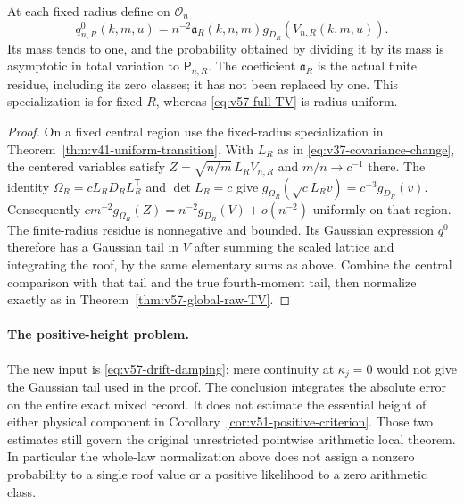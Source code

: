 \begin{corollary}
\label{cor:v57-fixed-radius-raw}
At each fixed radius define on $\mathcal O_n$
\[
 q^0_{n,R}(k,m,u)=n^{-2}\mathfrak a_R(k,n,m)
                                      g_{D_R}(V_{n,R}(k,m,u)).
\]
Its mass tends to one, and the probability obtained by dividing it
by its mass is asymptotic in total variation to $\mathsf P_{n,R}$.
The coefficient $\mathfrak a_R$ is the actual finite residue, including
its zero classes; it has not been replaced by one. This specialization
is for fixed $R$, whereas \eqref{eq:v57-full-TV} is radius-uniform.
\end{corollary}
\begin{proof}
On a fixed central region use the fixed-radius specialization in
Theorem~\ref{thm:v41-uniform-transition}. With $L_R$ as in
\eqref{eq:v37-covariance-change}, the centered variables satisfy
$Z=\sqrt{n/m}\,L_RV_{n,R}$ and $m/n\to c^{-1}$ there.
The identity $\Omega_R=cL_RD_RL_R^{\mathsf T}$ and $\det L_R=c$
give
$g_{\Omega_R}(\sqrt cL_Rv)=c^{-3}g_{D_R}(v)$.
Consequently $c m^{-2}g_{\Omega_R}(Z)=n^{-2}g_{D_R}(V)+o(n^{-2})$
uniformly on that region. The finite-radius residue is nonnegative
and bounded. Its Gaussian expression $q^0$ therefore has a Gaussian
tail in $V$ after summing the scaled lattice and integrating the roof,
by the same elementary sums as above. Combine the central comparison
with that tail and the true fourth-moment tail, then normalize exactly
as in Theorem~\ref{thm:v57-global-raw-TV}.
\end{proof}

\paragraph{The positive-height problem.}
The new input is \eqref{eq:v57-drift-damping}; mere continuity at
$\kappa_j=0$ would not give the Gaussian tail used in the proof.
The conclusion integrates the absolute error on the entire exact
mixed record. It does not estimate the essential height of either
physical component in Corollary~\ref{cor:v51-positive-criterion}.
Those two estimates still govern the original unrestricted pointwise
arithmetic local theorem. In particular the whole-law normalization
above does not assign a nonzero probability to a single roof value or
a positive likelihood to a zero arithmetic class.
